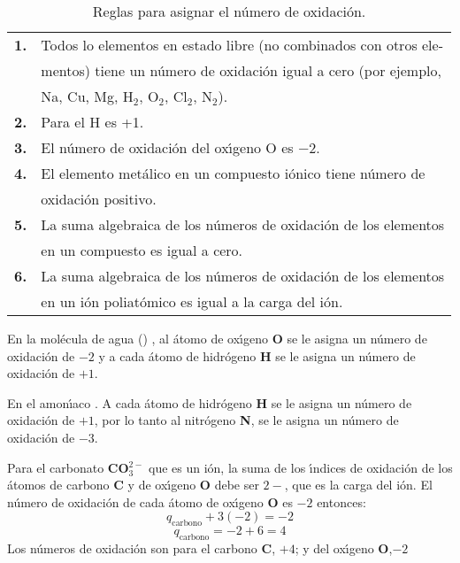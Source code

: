 \begin{table}[ht]
\caption{Reglas para asignar el n\'umero de oxidaci\'on.}
\begin{center}
\begin{tabular}{ cl }\hline
\textbf{1.}& Todos lo elementos en estado libre (no combinados con otros ele-\\
&mentos) tiene un n\'umero de oxidaci\'on igual a
 cero (por ejemplo,\\
&Na, Cu, Mg, H$_2$, O$_2$, Cl$_2$, N$_2$).\\
\textbf{2.}& Para el H es +1.\\
\textbf{3.}& El n\'umero de oxidaci\'on del ox\'{\i}geno O es $-2$.\\
\textbf{4.}& El elemento met\'alico en un compuesto i\'onico tiene n\'umero de\\
&oxidaci\'on positivo.\\
\textbf{5.}& La suma algebraica de los n\'umeros de oxidaci\'on de los elementos\\ &en un
compuesto es igual a cero.\\
\textbf{6.}& La suma algebraica de los n\'umeros de oxidaci\'on de los elementos\\ &en un
i\'on poliat\'omico es igual a la carga del i\'on.\\ \hline
\end{tabular}
\end{center}
\label{tab:5}
\end{table}

En la mol\'ecula de agua () , al \'atomo de ox\'{\i}geno 
\textbf{O} se le asigna un n\'umero de oxidaci\'on de $-2$ y a cada \'atomo de hidr\'ogeno
\textbf{H} se le asigna un n\'umero de oxidaci\'on de $+1$.

 En el amon\'{\i}aco . A cada \'atomo de hidr\'ogeno
\textbf{H} se le asigna un n\'umero de oxidaci\'on de $+1$, por lo tanto al nitr\'ogeno
\textbf{N}, se le asigna un n\'umero de oxidaci\'on de $-3$.

Para el carbonato \textbf{CO}$^{2-}_3$ que es un i\'on, la suma de los \'{\i}ndices de
oxidaci\'on de los \'atomos de carbono \textbf{C} y de ox\'{\i}geno \textbf{O} debe ser $2-$,  
que es la carga del i\'on. El n\'umero de oxidaci\'on de cada \'atomo de
ox\'{\i}geno \textbf{O} es $-2$ entonces:
 $$q_{\textrm{carbono}} + 3(-2) = -2$$
$$q_{\textrm{carbono}} = -2 + 6 = 4$$
Los n\'umeros de oxidaci\'on son para el carbono \textbf{C}, $+4$; y del ox\'{\i}geno
\textbf{O},$-2$

